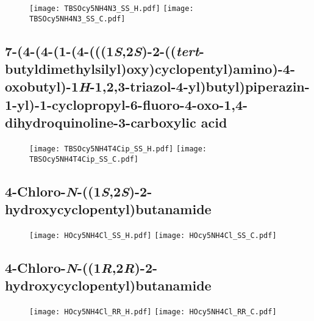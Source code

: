 \begin{figure}[H]
	\centering
		\texttt{[image: TBSOcy5NH4N3\_SS\_H.pdf]}
		\texttt{[image: TBSOcy5NH4N3\_SS\_C.pdf]}
\end{figure}

\subsection{7\hyp{}(4\hyp{}(4\hyp{}(1\hyp{}(4\hyp{}(((1\textit{S},2\textit{S})\hyp{}2\hyp{}((\textit{tert}\hyp{}butyldimethylsilyl)oxy)cyclopentyl)amino)\hyp{}4\hyp{}oxobutyl)\hyp{}1\textit{H}\hyp{}1,2,3\hyp{}triazol\hyp{}4\hyp{}yl)butyl)piperazin\hyp{}1\hyp{}yl)\hyp{}1\hyp{}cyclopropyl\hyp{}6\hyp{}fluoro\hyp{}4\hyp{}oxo\hyp{}1,4\hyp{}dihydroquinoline\hyp{}3\hyp{}carboxylic acid }

\begin{figure}[H]
	\centering
		\texttt{[image: TBSOcy5NH4T4Cip\_SS\_H.pdf]}
		\texttt{[image: TBSOcy5NH4T4Cip\_SS\_C.pdf]}
\end{figure}

\subsection{4\hyp{}Chloro\hyp{}\textit{N}\hyp{}((1\textit{S},2\textit{S})\hyp{}2\hyp{}hydroxycyclopentyl)butanamide }

\begin{figure}[H]
	\centering
		\texttt{[image: HOcy5NH4Cl\_SS\_H.pdf]}
		\texttt{[image: HOcy5NH4Cl\_SS\_C.pdf]}
\end{figure}

\subsection{4\hyp{}Chloro\hyp{}\textit{N}\hyp{}((1\textit{R},2\textit{R})\hyp{}2\hyp{}hydroxycyclopentyl)butanamide }

\begin{figure}[H]
	\centering
		\texttt{[image: HOcy5NH4Cl\_RR\_H.pdf]}
		\texttt{[image: HOcy5NH4Cl\_RR\_C.pdf]}
\end{figure}

